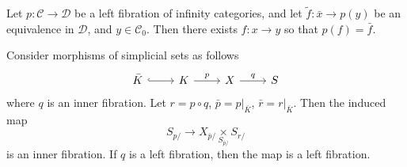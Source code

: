 \documentclass[main.tex]{subfiles}
\begin{document}
%
%
%

\begin{lemma}
  \label{lemma:can_lift_equivalences_along_left_fibrations}
  Let $p\colon \mathcal{C} \to \mathcal{D}$ be a left fibration of infinity categories, and let $\tilde{f}\colon \bar{x} \to p(y)$ be an equivalence in $\mathcal{D}$, and $y \in \mathcal{C}_{0}$. Then there exists $f\colon x \to y$ so that $p(f) = \bar{f}$.
\end{lemma}

\begin{lemma}
  \label{lemma:complicated_thing_is_left_fibration}
  Consider morphisms of simplicial sets as follows
  \begin{equation*}
    \begin{tikzcd}
      \bar{K}
      \arrow[r, hookrightarrow]
      & K
      \arrow[r, "p"]
      & X
      \arrow[r, "q"]
      & S
    \end{tikzcd}
  \end{equation*}
  where $q$ is an inner fibration. Let $r = p \circ q$, $\bar{p} = p|_{\bar{K}}$, $\bar{r} = r|_{\bar{K}}$. Then the induced map
  \begin{equation*}
    S_{p/} \to X_{\bar{p}/} \underset{S_{\bar{p}/}}{\times} S_{r/}
  \end{equation*}
  is an inner fibration. If $q$ is a left fibration, then the map is a left fibration.
\end{lemma}
\end{document}
